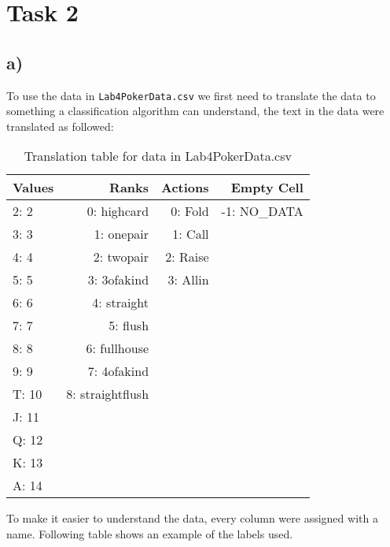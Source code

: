\documentclass{article}
\begin{document}
      \section{Task 2}
          \subsection{a)}
            To use the data in \verb$Lab4PokerData.csv$ we first need to translate the data to something a classification algorithm can understand, the text in the data
            were translated as followed:
            \begin{table}[H]
              \centering
              \label{tbl:task1f}
              \begin{tabular}{lrrr}
                \toprule
                Values &     Ranks &  Actions & Empty Cell \\
                \midrule
                2: 2 & 0: highcard & 0: Fold & -1: NO\_DATA \\
                3: 3 & 1: onepair & 1: Call & {} \\
                4: 4 & 2: twopair & 2: Raise & {} \\
                5: 5 & 3: 3ofakind & 3: Allin & {} \\
                6: 6 & 4: straight & {} & {} \\
                7: 7 & 5: flush & {} & {} \\
                8: 8 & 6: fullhouse & {} & {} \\
                9: 9 & 7: 4ofakind & {} & {} \\
                T: 10 & 8: straightflush & {} & {} \\
                J: 11 & {} & {} & {} \\
                Q: 12 & {} & {} & {} \\
                K: 13 & {} & {} & {} \\
                A: 14 & {} & {} & {} \\
                \bottomrule
              \end{tabular}
              \caption{Translation table for data in Lab4PokerData.csv}
            \end{table}
            To make it easier to understand the data, every column were assigned with a name. Following 
            table shows an example of the labels used.
\end{document}
